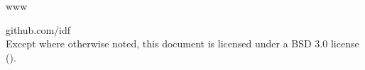 \onecolumn
\begin{titlepage}
www\\
\end{titlepage}

\newpage
\noindent {} github.com/idf \\
Except where otherwise noted, this document is licensed under a BSD 3.0
license ().
